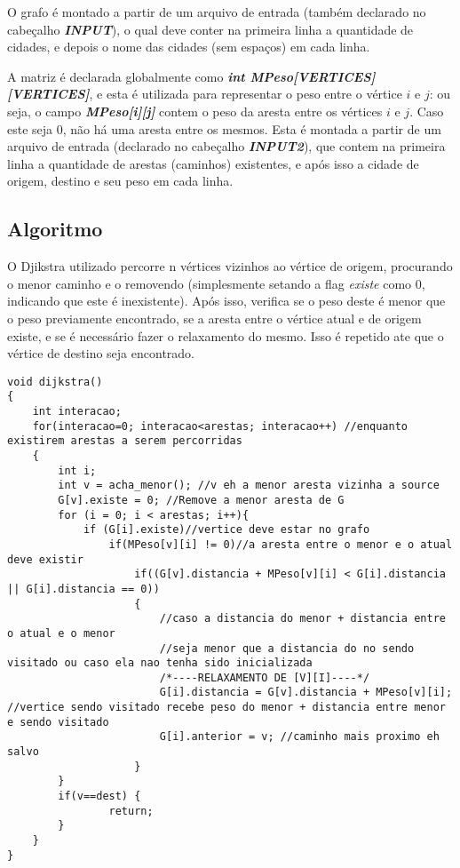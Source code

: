 \documentclass[10pt,a4paper]{article}
\begin{document}
O grafo é montado a partir de um arquivo de entrada (também declarado no cabeçalho \textit{\textbf{INPUT}}), o qual deve conter na primeira linha a quantidade de cidades, e depois o nome das cidades (sem espaços) em cada linha.

A matriz é declarada globalmente como \textit{\textbf{int MPeso[VERTICES][VERTICES]}}, e esta é utilizada para representar o peso entre o vértice $i$ e $j$: ou seja, o campo \textit{\textbf{MPeso[i][j]}} contem o peso da aresta entre os vértices $i$ e $j$. Caso este seja 0, não há uma aresta entre os mesmos. Esta é montada a partir de um arquivo de entrada (declarado no cabeçalho \textit{\textbf{INPUT2}}), que contem na primeira linha a quantidade de arestas (caminhos) existentes, e após isso a cidade de origem, destino e seu peso em cada linha.

\subsection{Algoritmo}

O Djikstra utilizado percorre n vértices vizinhos ao vértice de origem, procurando o menor caminho e o removendo (simplesmente setando a flag \textit{existe} como 0, indicando que este é inexistente). Após isso, verifica se o peso deste é menor que o peso previamente encontrado, se a aresta entre o vértice atual e de origem existe, e se é necessário fazer o relaxamento do mesmo. Isso é repetido ate que o vértice de destino seja encontrado.

\newpage
\begin{lstlisting}
void dijkstra()
{
    int interacao;
    for(interacao=0; interacao<arestas; interacao++) //enquanto existirem arestas a serem percorridas
    {
        int i;
        int v = acha_menor(); //v eh a menor aresta vizinha a source
        G[v].existe = 0; //Remove a menor aresta de G
        for (i = 0; i < arestas; i++){
            if (G[i].existe)//vertice deve estar no grafo
                if(MPeso[v][i] != 0)//a aresta entre o menor e o atual deve existir
                    if((G[v].distancia + MPeso[v][i] < G[i].distancia || G[i].distancia == 0))
                    {
                        //caso a distancia do menor + distancia entre o atual e o menor
                        //seja menor que a distancia do no sendo visitado ou caso ela nao tenha sido inicializada
                        /*----RELAXAMENTO DE [V][I]----*/
                        G[i].distancia = G[v].distancia + MPeso[v][i]; //vertice sendo visitado recebe peso do menor + distancia entre menor e sendo visitado
                        G[i].anterior = v; //caminho mais proximo eh salvo
                    }
        }
        if(v==dest) {
                return;
        }
    }
}
\end{lstlisting}
\end{document}
